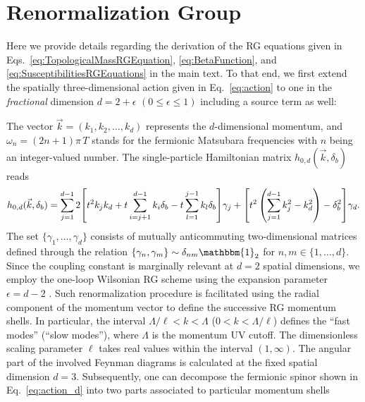 \documentclass[reprint,floatfix, twocolumn]{revtex4-1}
\begin{document}
\section{Renormalization Group}\label{sec:RenormalizationGroup}
Here we provide details regarding the derivation of the RG equations given in Eqs.~\eqref{eq:TopologicalMassRGEquation}, \eqref{eq:BetaFunction}, and \eqref{eq:SusceptibilitiesRGEquations} in the main text. To that end, we first extend the spatially three-dimensional action given in Eq.~\eqref{eq:action} to one in the \textit{fractional} dimension $d=2+\epsilon$ $(0\leq\epsilon\leq1)$ including a source term as well:
The vector $\vec{k}=(k_1,k_2,\dots,k_d)$ represents the $d$-dimensional momentum, and $\omega_n=(2n+1)\pi\,T$ stands for the fermionic Matsubara frequencies with $n$ being an integer-valued number. The single-particle Hamiltonian matrix $h_{0,d}(\vec{k}, \delta_b)$ reads
\begin{align}\label{eq:hamiltonian_d}
	 h_{0,d}(\vec{k}, \delta_b)=\sum^{d-1}_{j=1}2\qty[t^2k_jk_d+t\sum^{d-1}_{i=j+1}k_i\delta_b-t\sum^{j-1}_{l=1}k_l\delta_b]\gamma_j + \qty[t^2\left(\sum^{d-1}_{j=1}k^2_j-k^2_d\right)- \delta_b^2]\gamma_d.
\end{align}
The set $\{\gamma_1,\dots,\gamma_d\}$ consists of mutually anticommuting two-dimensional matrices defined through the relation $\{\gamma_n,\gamma_m\}\sim\delta_{nm}\mathbbm{1}_2$ for $n,m\in\{1,\dots,d\}$. Since the coupling constant is marginally relevant at $d=2$ spatial dimensions, we employ the one-loop Wilsonian RG scheme using the expansion parameter $\epsilon=d-2$ \cite{herbut2007,goldenfeld2018}. Such renormalization procedure is facilitated using the radial component of the momentum vector to define the successive RG momentum shells. In particular, the interval $\Lambda/\ell<k<\Lambda$ ($0<k<\Lambda/\ell$) defines the ``fast modes'' (``slow modes''), where $\Lambda$ is the momentum UV cutoff. The dimensionless scaling parameter $\ell$ takes real values within the interval $(1,\infty)$. The angular part of the involved Feynman diagrams is calculated at the fixed spatial dimension $d=3$. Subsequently, one can decompose the fermionic spinor shown in Eq.~\eqref{eq:action_d} into two parts associated to particular momentum shells
\end{document}
